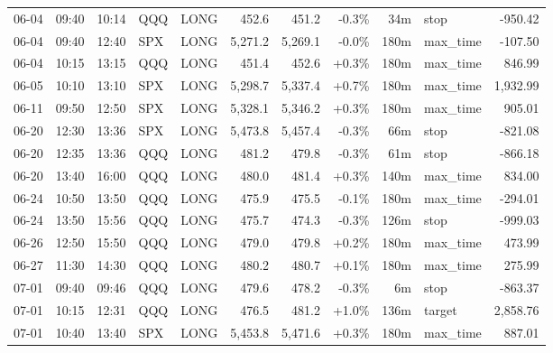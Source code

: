 \documentclass[11pt,a4paper,twoside]{article}
\begin{document}
\begin{center}
\begin{longtable}{>{\color{txtmain}}l l l l l r r r r >{\color{txtmain}}l r}
06-04 & 09:40 & 10:14 & QQQ & LONG & 452.6 & 451.2 & \textcolor{lossred}{-0.3\%} & 34m & stop & \textcolor{lossred}{-950.42} \\
06-04 & 09:40 & 12:40 & SPX & LONG & 5,271.2 & 5,269.1 & \textcolor{lossred}{-0.0\%} & 180m & max\_time & \textcolor{lossred}{-107.50} \\
06-04 & 10:15 & 13:15 & QQQ & LONG & 451.4 & 452.6 & \textcolor{wingreen}{+0.3\%} & 180m & max\_time & \textcolor{wingreen}{846.99} \\
06-05 & 10:10 & 13:10 & SPX & LONG & 5,298.7 & 5,337.4 & \textcolor{wingreen}{+0.7\%} & 180m & max\_time & \textcolor{wingreen}{1,932.99} \\
06-11 & 09:50 & 12:50 & SPX & LONG & 5,328.1 & 5,346.2 & \textcolor{wingreen}{+0.3\%} & 180m & max\_time & \textcolor{wingreen}{905.01} \\
06-20 & 12:30 & 13:36 & SPX & LONG & 5,473.8 & 5,457.4 & \textcolor{lossred}{-0.3\%} & 66m & stop & \textcolor{lossred}{-821.08} \\
06-20 & 12:35 & 13:36 & QQQ & LONG & 481.2 & 479.8 & \textcolor{lossred}{-0.3\%} & 61m & stop & \textcolor{lossred}{-866.18} \\
06-20 & 13:40 & 16:00 & QQQ & LONG & 480.0 & 481.4 & \textcolor{wingreen}{+0.3\%} & 140m & max\_time & \textcolor{wingreen}{834.00} \\
06-24 & 10:50 & 13:50 & QQQ & LONG & 475.9 & 475.5 & \textcolor{lossred}{-0.1\%} & 180m & max\_time & \textcolor{lossred}{-294.01} \\
06-24 & 13:50 & 15:56 & QQQ & LONG & 475.7 & 474.3 & \textcolor{lossred}{-0.3\%} & 126m & stop & \textcolor{lossred}{-999.03} \\
06-26 & 12:50 & 15:50 & QQQ & LONG & 479.0 & 479.8 & \textcolor{wingreen}{+0.2\%} & 180m & max\_time & \textcolor{wingreen}{473.99} \\
06-27 & 11:30 & 14:30 & QQQ & LONG & 480.2 & 480.7 & \textcolor{wingreen}{+0.1\%} & 180m & max\_time & \textcolor{wingreen}{275.99} \\
07-01 & 09:40 & 09:46 & QQQ & LONG & 479.6 & 478.2 & \textcolor{lossred}{-0.3\%} & 6m & stop & \textcolor{lossred}{-863.37} \\
07-01 & 10:15 & 12:31 & QQQ & LONG & 476.5 & 481.2 & \textcolor{wingreen}{+1.0\%} & 136m & target & \textcolor{wingreen}{2,858.76} \\
07-01 & 10:40 & 13:40 & SPX & LONG & 5,453.8 & 5,471.6 & \textcolor{wingreen}{+0.3\%} & 180m & max\_time & \textcolor{wingreen}{887.01} \\

\end{longtable}
\end{center}
\end{document}
